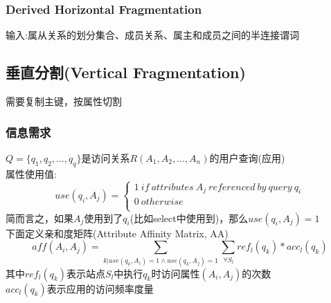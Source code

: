 \documentclass{article}
\begin{document}
\begin{CJK}{UTF8}{gbsn}
	\subsubsection*{Derived Horizontal Fragmentation}
	输入:属从关系的划分集合、成员关系、属主和成员之间的半连接谓词\\
	
	
	\subsection*{垂直分割(Vertical Fragmentation)}
	需要复制主键，按属性切割\\
	\subsubsection*{信息需求}
	$Q=\{q_1,q_2,...,q_q\}$是访问关系$R(A_1,A_2,...,A_n)$的用户查询(应用)\\
	属性使用值:\\
	\begin{equation*}
	use(q_i,A_j)=\begin{cases}
	1\ if\ attributes\ A_j\ referenced\ by\ query\ q_i\\
	0\ otherwise\\
	\end{cases}
	\end{equation*}
	简而言之，如果$A_j$使用到了$q_i$(比如select中使用到)，那么$use(q_i,A_j)=1$\\
	下面定义亲和度矩阵(Attribute Affinity Matrix, AA)\\
	\begin{equation*}
	aff(A_i,A_j)=\sum_{k|use(q_k,A_i)=1\land use(q_k,A_j)=1}\sum_{\forall S_l} ref_l(q_k)*acc_l(q_k)
	\end{equation*}
	其中$ref_l(q_k)$表示站点$S_l$中执行$q_k$时访问属性$(A_i,A_j)$的次数\\
	$acc_l(q_k)$表示应用的访问频率度量\\

\end{CJK}
\end{document}
